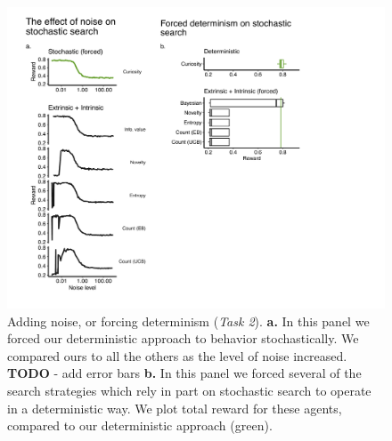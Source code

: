 \begin{figure}
	\begin{fullwidth}
	\includegraphics[width=0.6\linewidth]{img/forced.pdf} 
	\caption{Adding noise, or forcing determinism (\textit{Task 2}). 
	\textbf{a.} In this panel we forced our deterministic approach to behavior stochastically. We compared ours to all the others as the level of noise increased. \textbf{TODO} - add error bars
	\textbf{b.} In this panel we forced several of the search strategies which rely in part on stochastic search to operate in a deterministic way. We plot total reward for these agents, compared to our deterministic approach (green).
	}
	\label{fig:forced}
	\end{fullwidth}
\end{figure}


